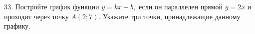 33. Постройте график функции $y=kx+b,$ если он параллелен прямой $y=2x$ и проходит через точку $A(2;7).$ Укажите три точки, принадлежащие данному графику.\\
